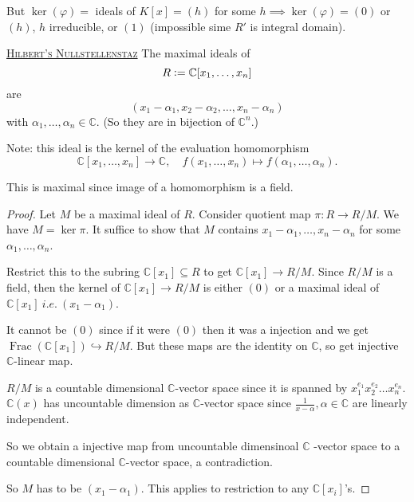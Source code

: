 \documentclass{article}
\newcommand{\C}{\mathbb{C}}
\newcommand{\ie}{\ i.e.\ }
\newcommand{\defeq}{\vcentcolon=}
\newcommand{\fancyem}[1]{\underline{\textsc{#1}}}
\theoremstyle{definition}
\theoremstyle{remark}
\begin{document}
But $\ker(\varphi) = $ ideals of $K[x] = (h)$ for some $h \implies \ker(\varphi) = (0)$ or $(h)$, $h$ irreducible, or $(1)$ (impossible sime $R'$ is integral domain).

\fancyem{Hilbert's Nullstellenstaz}
The maximal ideals of \[R \defeq \C[x_1, \ldots, x_n]\] are \[(x_1 - \alpha_1, x_2 - \alpha_2, \ldots, x_n - \alpha_n)\] with $\alpha_1, \ldots, \alpha_n \in \C$. (So they are in bijection of $\C^n$.)

Note: this ideal is the kernel of the evaluation homomorphism 
\[
\C[x_1, \ldots, x_n] \to \C, \quad f(x_1, \ldots, x_n) \mapsto f(\alpha_1, \ldots, \alpha_n).
\]

This is maximal since image of a homomorphism is a field.

\begin{proof}
    Let $M$ be a maximal ideal of $R$. Consider quotient map $\pi: R \to R/M$. We have $M = \ker \pi$. It suffice to show that $M$ contains $x_1 - \alpha_1, \ldots, x_n - \alpha_n$ for some $\alpha_1, \ldots, \alpha_n$. 
    
    Restrict this to the subring $\C[x_1] \subseteq R$ to get $\C[x_1] \to R/M$. Since $R/M$ is a field, then the kernel of $\C[x_1] \to R/M$ is either $(0)$ or a maximal ideal of $\C[x_1] \ie (x_1 - \alpha_1)$.

    It cannot be $(0)$ since if it were $(0)$ then it was a injection and we get $\operatorname{Frac}(\C[x_1]) \hookrightarrow R/M$. But these maps are the identity on $\C$, so get injective $\C$-linear map.
    
    $R/M$ is a countable dimensional $\C$-vector space since it is spanned by $x_1^{e_1}x_2^{e_2}\ldots x_n^{e_n}$. $\C(x)$ has uncountable dimension as $\C$-vector space since $\frac{1}{x - \alpha}, \alpha \in \C$ are linearly independent.
    
    So we obtain a injective map from uncountable dimensinoal $\C$ -vector space to a countable dimensional $\C$-vector space, a contradiction.

    So $M$ has to be $(x_1 - \alpha_1)$. This applies to restriction to any $\C[x_i]$'s.
\end{proof}
\end{document}

